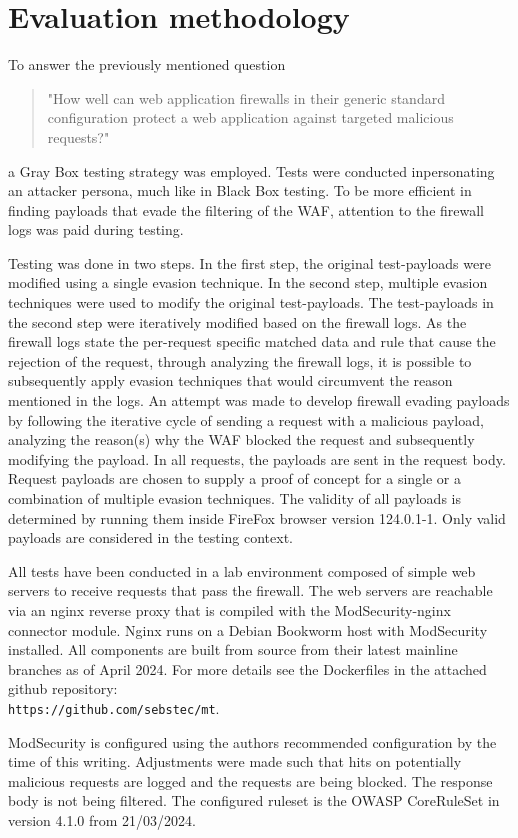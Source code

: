 \section{Evaluation methodology}
\label{sec:evaluation}
To answer the previously mentioned question
\begin{quote} "How well can web application firewalls in their generic standard configuration protect a web application against targeted malicious requests?"
\end{quote}
a Gray Box testing strategy was employed. Tests were conducted inpersonating an attacker persona, much like in Black Box testing.
To be more efficient in finding payloads that evade the filtering of the WAF, attention to the firewall logs was paid during testing.

Testing was done in two steps. In the first step, the original test-payloads were modified using a single evasion technique.
In the second step, multiple evasion techniques were used to modify the original test-payloads.
The test-payloads in the second step were iteratively modified based on the firewall logs.
As the firewall logs state the per-request specific matched data and rule that cause the rejection of the request, through analyzing the firewall logs, it is possible to subsequently apply evasion techniques that would circumvent the reason mentioned in the logs.
An attempt was made to develop firewall evading payloads by following the iterative cycle of sending a request with a malicious payload, analyzing the reason(s) why the WAF blocked the request and subsequently modifying the payload. In all requests, the payloads are sent in the request body.
Request payloads are chosen to supply a proof of concept for a single or a combination of multiple evasion techniques. The validity of all payloads is determined by running them inside FireFox browser version 124.0.1-1. Only valid payloads are considered in the testing context. %

All tests have been conducted in a lab environment composed of simple web servers to receive requests that pass the firewall.
The web servers are reachable via an nginx reverse proxy that is compiled with the ModSecurity-nginx connector module. Nginx runs on a Debian Bookworm host with ModSecurity installed.
All components are built from source from their latest mainline branches as of April 2024.
For more details see the Dockerfiles in the attached github repository:\\ \verb|https://github.com/sebstec/mt|. 

ModSecurity is configured using the authors recommended configuration by the time of this writing. \cite{modsec/recconf}
Adjustments were made such that hits on potentially malicious requests are logged and the requests are being blocked. The response body is not being filtered.
The configured ruleset is the OWASP CoreRuleSet in version 4.1.0 from 21/03/2024. \cite{crs/410dl}
